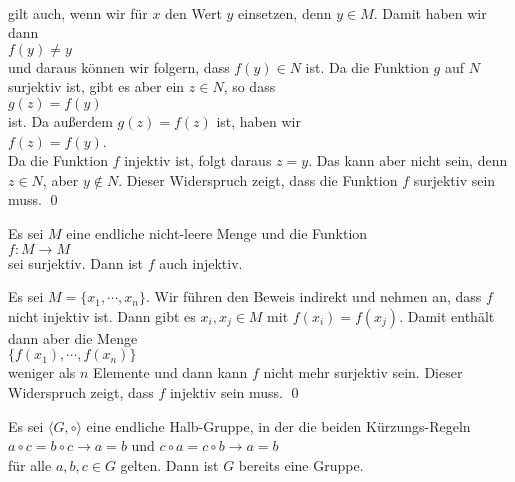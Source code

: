 \begin{enumerate}
             \\[0.2cm]
             gilt auch, wenn wir für $x$ den Wert $y$ einsetzen, denn $y \in M$.  Damit haben wir dann
             \\[0.2cm]
             \hspace*{1.3cm}
             $f(y) \not= y$
             \\[0.2cm]
             und daraus können wir folgern, dass $f(y) \in N$ ist.  Da die Funktion $g$ auf $N$
             surjektiv ist, gibt es aber ein $z \in N$, so dass
             \\[0.2cm]
             \hspace*{1.3cm}
             $g(z) = f(y)$
             \\[0.2cm]
             ist.  Da außerdem $g(z) = f(z)$ ist, haben wir
             \\[0.2cm]
             \hspace*{1.3cm}
             $f(z) = f(y)$.
             \\[0.2cm]
             Da die Funktion $f$ injektiv ist, folgt daraus $z = y$.  Das kann aber nicht
             sein, denn $z \in N$, aber $y \not\in N$.  Dieser Widerspruch zeigt, dass die Funktion
             $f$ surjektiv sein muss.  \qed
\end{enumerate}

\begin{Satz}
  Es sei $M$ eine endliche nicht-leere Menge und die Funktion 
  \\[0.2cm]
  \hspace*{1.3cm}
  $f:M \rightarrow M$
  \\[0.2cm]
  sei surjektiv.  Dann ist $f$ auch injektiv.
\end{Satz}

\proof
Es sei $M = \{x_1, \cdots, x_n \}$.  Wir führen den Beweis indirekt und nehmen an, dass $f$ nicht injektiv
ist.  Dann gibt es $x_i, x_j \in M$ mit $f(x_i) = f(x_j)$.  Damit enthält dann aber die Menge
\\[0.2cm]
\hspace*{1.3cm}
$\{ f(x_1), \cdots, f(x_n) \}$
\\[0.2cm]
weniger als $n$ Elemente und dann kann $f$ nicht mehr surjektiv sein.  Dieser Widerspruch zeigt, dass $f$
injektiv sein muss.
\qed

\begin{Satz}
  Es sei $\langle G, \circ \rangle$ eine endliche Halb-Gruppe, in der die beiden Kürzungs-Regeln
  \\[0.2cm]
  \hspace*{1.3cm}
  $a \circ c = b \circ c \rightarrow a = b$ \quad und \quad
  $c \circ a = c \circ b \rightarrow a = b$
  \\[0.2cm]
  für alle $a,b,c \in G$ gelten.  Dann ist $G$ bereits eine Gruppe.
\end{Satz}


